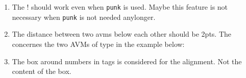 \documentclass[output=book
		,modfonts
		,nonflat
	        ,collection
	        ,collectionchapter
	        ,collectiontoclongg
 	        ,biblatex  
                ,babelshorthands
                ,newtxmath
                ,colorlinks, citecolor=brown 
                ,draftmode
		  ]{langscibook}
\begin{document}
\begin{enumerate}

\item 


The ! should work even when \verb+punk+ is used. Maybe this feature is not
necessary when \verb+punk+ is not needed anylonger.
\ea
{}
\z

\item %
The distance between two avms below each other should be 2pts. The concernes the two AVMs of type
 in the example below:

\ea
{}
\z

\item 
The box around numbers in tags is considered for the alignment. Not the content of the box.


\end{enumerate}
\end{document}
